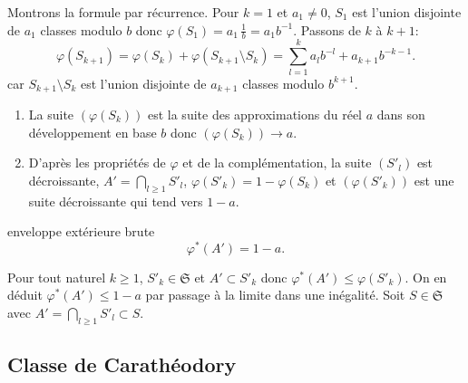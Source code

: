\begin{demo}
Montrons la formule par récurrence.\newline
 Pour $k=1$ et $a_1 \neq 0$, $S_1$ est l'union disjointe de $a_1$ classes modulo $b$ donc $\varphi(S_1)= a_1\, \frac{1}{b} = a_1 b^{-1}$.\newline
Passons de $k$ à $k+1$:
\begin{displaymath}
 \varphi(S_{k+1}) = \varphi(S_k) + \varphi(S_{k+1} \setminus S_k)
 = \sum_{l=1}^k a_l b^{-l} + a_{k+1}b^{-k-1}.
\end{displaymath}
car $S_{k+1} \setminus S_k$ est l'union disjointe de $a_{k+1}$ classes modulo $b^{k+1}$.
\end{demo}
\begin{rems}
  \begin{enumerate}
   \item La suite $(\varphi(S_k))$ est la suite des approximations du réel $a$ dans son développement en base $b$ donc $(\varphi(S_k)) \rightarrow a$.
   \item D'après les propriétés de $\varphi$ et de la complémentation, la suite $(S'_l)$ est décroissante, $A' = \bigcap_{l\geq 1} S'_l$, $\varphi(S'_k) = 1 - \varphi(S_k)$ et
   $(\varphi(S'_k))$ est une suite décroissante qui tend vers $1-a$.
  \end{enumerate}
 \end{rems}
\begin{prop}{enveloppe extérieure brute}
 \begin{displaymath}
  \varphi^*(A') = 1 - a .
 \end{displaymath}
\end{prop}
\begin{demo}
 Pour tout naturel $k\geq 1$, $S'_k \in \mathfrak{S}$ et $A' \subset S'_k$ donc $\varphi^*(A') \leq \varphi(S'_k)$. On en déduit $\varphi^*(A') \leq 1-a$ par passage à la limite dans une inégalité.\newline
 Soit $S \in \mathfrak{S}$ avec  $A'= \bigcap_{l\geq 1} S'_l \subset S$.
\end{demo}
\subsection{Classe de Carathéodory} \label{ClasseCaratheodory}



